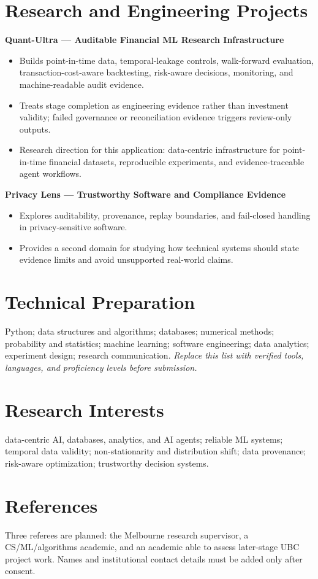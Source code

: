 \documentclass[11pt]{article}
\begin{document}
\section*{Research and Engineering Projects}
\textbf{Quant-Ultra --- Auditable Financial ML Research Infrastructure}
\begin{itemize}
\item Builds point-in-time data, temporal-leakage controls, walk-forward evaluation, transaction-cost-aware backtesting, risk-aware decisions, monitoring, and machine-readable audit evidence.
\item Treats stage completion as engineering evidence rather than investment validity; failed governance or reconciliation evidence triggers review-only outputs.
\item Research direction for this application: data-centric infrastructure for point-in-time financial datasets, reproducible experiments, and evidence-traceable agent workflows.
\end{itemize}

\begin{samepage}
\textbf{Privacy Lens --- Trustworthy Software and Compliance Evidence}
\begin{itemize}
\item Explores auditability, provenance, replay boundaries, and fail-closed handling in privacy-sensitive software.
\item Provides a second domain for studying how technical systems should state evidence limits and avoid unsupported real-world claims.
\end{itemize}
\end{samepage}

\section*{Technical Preparation}
Python; data structures and algorithms; databases; numerical methods; probability and statistics; machine learning; software engineering; data analytics; experiment design; research communication. \textit{Replace this list with verified tools, languages, and proficiency levels before submission.}

\section*{Research Interests}
data-centric AI, databases, analytics, and AI agents; reliable ML systems; temporal data validity; non-stationarity and distribution shift; data provenance; risk-aware optimization; trustworthy decision systems.

\section*{References}
Three referees are planned: the Melbourne research supervisor, a CS/ML/algorithms academic, and an academic able to assess later-stage UBC project work. Names and institutional contact details must be added only after consent.
\end{document}
